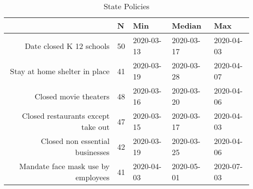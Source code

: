 \begin{table}[ht]
\centering
\begin{tabular}{rllll}
  \hline
 & N & Min & Median & Max \\ 
  \hline
Date closed K 12 schools & 50 & 2020-03-13 & 2020-03-17 & 2020-04-03 \\ 
  Stay at home  shelter in place & 41 & 2020-03-19 & 2020-03-28 & 2020-04-07 \\ 
  Closed movie theaters & 48 & 2020-03-16 & 2020-03-20 & 2020-04-06 \\ 
  Closed restaurants except take out & 47 & 2020-03-15 & 2020-03-17 & 2020-04-03 \\ 
  Closed non essential businesses & 42 & 2020-03-19 & 2020-03-25 & 2020-04-06 \\ 
  Mandate face mask use by employees & 41 & 2020-04-03 & 2020-05-01 & 2020-07-03 \\ 
   \hline
\end{tabular}
\caption{State Policies \label{tab:policies_inreg}} 
\end{table}
